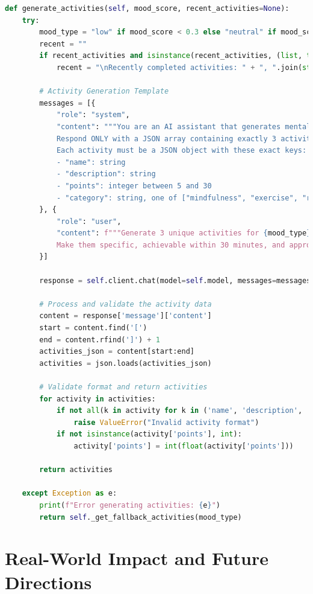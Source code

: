 \documentclass[12pt]{article}
\begin{document}
\begin{lstlisting}[language=Python, caption=Dynamic Activity Generation]
def generate_activities(self, mood_score, recent_activities=None):
    try:
        mood_type = "low" if mood_score < 0.3 else "neutral" if mood_score < 0.7 else "positive"
        recent = ""
        if recent_activities and isinstance(recent_activities, (list, tuple)):
            recent = "\nRecently completed activities: " + ", ".join(str(act) for act in recent_activities)

        # Activity Generation Template
        messages = [{
            "role": "system",
            "content": """You are an AI assistant that generates mental health activities. 
            Respond ONLY with a JSON array containing exactly 3 activities.
            Each activity must be a JSON object with these exact keys:
            - "name": string
            - "description": string
            - "points": integer between 5 and 30
            - "category": string, one of ["mindfulness", "exercise", "reflection", "social", "creative"]"""
        }, {
            "role": "user",
            "content": f"""Generate 3 unique activities for {mood_type} mood (score: {mood_score:.2f}).{recent}
            Make them specific, achievable within 30 minutes, and appropriate for the current mood."""
        }]

        response = self.client.chat(model=self.model, messages=messages)
        
        # Process and validate the activity data
        content = response['message']['content']
        start = content.find('[')
        end = content.rfind(']') + 1
        activities_json = content[start:end]
        activities = json.loads(activities_json)
        
        # Validate format and return activities
        for activity in activities:
            if not all(k in activity for k in ('name', 'description', 'points', 'category')):
                raise ValueError("Invalid activity format")
            if not isinstance(activity['points'], int):
                activity['points'] = int(float(activity['points']))
        
        return activities

    except Exception as e:
        print(f"Error generating activities: {e}")
        return self._get_fallback_activities(mood_type)
\end{lstlisting}

\section{Real-World Impact and Future Directions}
\end{document}
